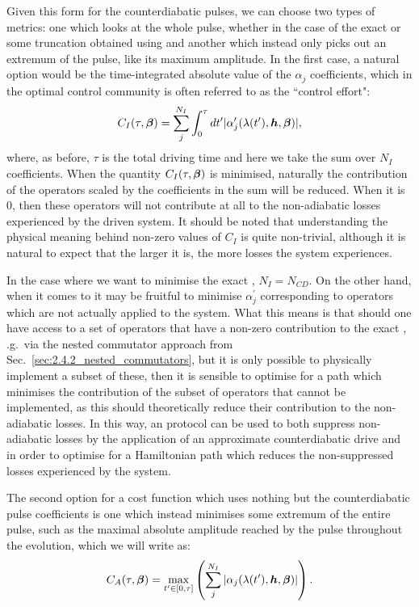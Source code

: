 Given this form for the counterdiabatic pulses, we can choose two types of metrics: one which looks at the whole pulse, whether in the case of the exact  or some truncation obtained using  and another which instead only picks out an extremum of the pulse, like its maximum amplitude. In the first case, a natural option would be the time-integrated absolute value of the $\alpha_j$ coefficients, which in the optimal control community is often referred to as the ``control effort"\cite{petersen_control_1987}:
\begin{equation}\label{eq:COLD_costfunc_integral}
    C_I(\tau, \boldsymbol{\beta}) = \sum_j^{N_I} \int_{0}^{\tau} dt^{\prime} |\alpha_j^{\prime}(\lambda(t^{\prime}), \boldsymbol{h}, \boldsymbol{\beta})|,
\end{equation}
where, as before, $\tau$ is the total driving time and here we take the sum over $N_I$ coefficients. When the quantity $C_I(\tau, \boldsymbol{\beta})$ is minimised, naturally the contribution of the operators scaled by the coefficients in the sum will be reduced. When it is $0$, then these operators will not contribute at all to the non-adiabatic losses experienced by the driven system. It should be noted that understanding the physical meaning behind non-zero values of $C_I$ is quite non-trivial, although it is natural to expect that the larger it is, the more losses the system experiences. 

In the case where we want to minimise the exact , $N_I = N_{CD}$. On the other hand, when it comes to  it may be fruitful to minimise $\alpha_j^{\prime}$ corresponding to operators which are not actually applied to the system. What this means is that should one have access to a set of operators that have a non-zero contribution to the exact , \@e.g.~via the nested commutator approach from Sec.~\ref{sec:2.4.2_nested_commutators}, but it is only possible to physically implement a subset of these, then it is sensible to optimise for a path which minimises the contribution of the subset of operators that cannot be implemented, as this should theoretically reduce their contribution to the non-adiabatic losses. In this way, an  protocol can be used to both suppress non-adiabatic losses by the application of an approximate counterdiabatic drive and in order to optimise for a Hamiltonian path which reduces the non-suppressed losses experienced by the system.

The second option for a cost function which uses nothing but the counterdiabatic pulse coefficients is one which instead minimises some extremum of the entire pulse, such as the maximal absolute amplitude reached by the pulse throughout the evolution, which we will write as:
\begin{equation}\label{eq:COLD_costfunc_maximum}
    C_A(\tau, \boldsymbol{\beta}) = \max_{t^{\prime} \in [0,\tau]} \left( \sum_j^{N_I} | \alpha_j(\lambda(t^{\prime}), \boldsymbol{h}, \boldsymbol{\beta})|\right).
\end{equation}

